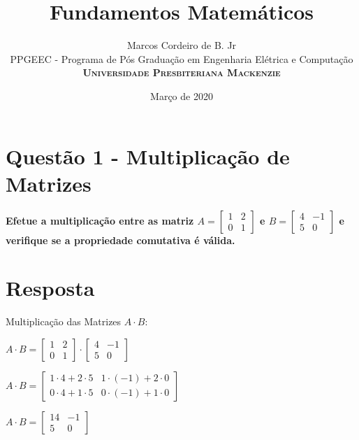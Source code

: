 \documentclass[a4paper, 12pt]{article}
\title{Fundamentos Matemáticos}
\author{Marcos Cordeiro de B. Jr\\ 
PPGEEC - Programa de Pós Graduação em Engenharia Elétrica e Computação\\
\textsc{\textbf{Universidade Presbiteriana Mackenzie}}
}
\date{Março de 2020}
\begin{document}
  
\setlength{\droptitle}{-5em}    
\maketitle

\section*{Questão 1 - Multiplicação de Matrizes}
  {\bfseries Efetue a multiplicação entre as matriz $A = 
  \begin{bmatrix}
    1 & 2 \\
    0 & 1
  \end{bmatrix}$ 
  e $B = 
  \begin{bmatrix}
    4 & -1 \\
    5 & 0
  \end{bmatrix}$ 
  e verifique se a propriedade comutativa é válida. }

  \section*{Resposta}
  Multiplicação das Matrizes $A \cdot B$:
  \begin{center}
    $A \cdot B = 
    \begin{bmatrix}
      1 & 2 \\
      0 & 1
    \end{bmatrix} 
    \cdot
    \begin{bmatrix}
      4 & -1 \\
      5 & 0
    \end{bmatrix}$

    $A \cdot B = 
    \begin{bmatrix}
      1 \cdot 4 + 2 \cdot 5 & 1 \cdot (-1) + 2 \cdot 0 \\
      0 \cdot 4 + 1 \cdot 5 & 0 \cdot (-1) + 1 \cdot 0 
    \end{bmatrix}$

    $A \cdot B = 
      \begin{bmatrix}
        14 & -1 \\
        5 & 0
      \end{bmatrix}$
  \end{center}
\end{document}
